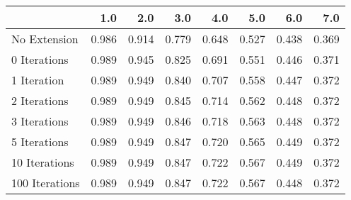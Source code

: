 \begin{tabular}{lrrrrrrr}
\toprule
{} &   1.0 &   2.0 &   3.0 &   4.0 &   5.0 &   6.0 &   7.0 \\
\midrule
No Extension   & 0.986 & 0.914 & 0.779 & 0.648 & 0.527 & 0.438 & 0.369 \\
0 Iterations   & 0.989 & 0.945 & 0.825 & 0.691 & 0.551 & 0.446 & 0.371 \\
1 Iteration    & 0.989 & 0.949 & 0.840 & 0.707 & 0.558 & 0.447 & 0.372 \\
2 Iterations   & 0.989 & 0.949 & 0.845 & 0.714 & 0.562 & 0.448 & 0.372 \\
3 Iterations   & 0.989 & 0.949 & 0.846 & 0.718 & 0.563 & 0.448 & 0.372 \\
5 Iterations   & 0.989 & 0.949 & 0.847 & 0.720 & 0.565 & 0.449 & 0.372 \\
10 Iterations  & 0.989 & 0.949 & 0.847 & 0.722 & 0.567 & 0.449 & 0.372 \\
100 Iterations & 0.989 & 0.949 & 0.847 & 0.722 & 0.567 & 0.448 & 0.372 \\
\bottomrule
\end{tabular}

